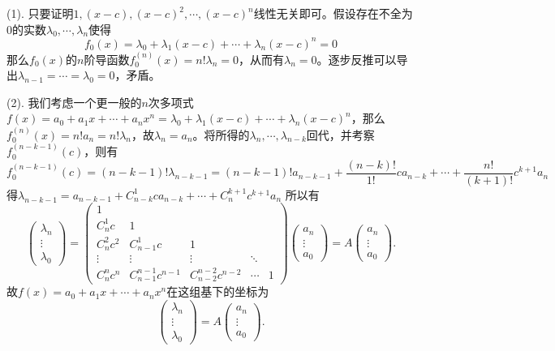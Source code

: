 (1). 只要证明$1, (x-c), (x-c)^2, \cdots, (x-c)^n$线性无关即可。假设存在不全为0的实数$\lambda_0,\cdots,\lambda_n$使得
$$f_0(x) = \lambda_0 + \lambda_1(x-c) + \cdots + \lambda_n(x-c)^n = 0$$
那么$f_0(x)$的$n$阶导函数$f_0^{(n)}(x) = n!\lambda_n = 0$，从而有$\lambda_n = 0$。逐步反推可以导出$\lambda_{n-1} = \cdots = \lambda_0 = 0$，矛盾。

(2). 我们考虑一个更一般的$n$次多项式$f(x) = a_0 + a_1x + \cdots + a_nx^n = \lambda_0 + \lambda_1(x-c) + \cdots + \lambda_n(x-c)^n$，那么$f_0^{(n)}(x) = n! a_n = n! \lambda_n$，故$\lambda_n = a_n$。将所得的$\lambda_n,\cdots,\lambda_{n-k}$回代，并考察$f_0^{(n-k-1)}(c)$，则有
$$
f_0^{(n-k-1)}(c) = (n-k-1)!\lambda_{n-k-1} = (n-k-1)!a_{n-k-1} + \dfrac{(n-k)!}{1!} c a_{n-k} + \cdots + \dfrac{n!}{(k+1)!} c^{k+1} a_{n}
$$
得$\lambda_{n-k-1} = a_{n-k-1} + C_{n-k}^1c a_{n-k} + \cdots + C_{n}^{k+1}c^{k+1} a_{n}$
所以有
$$
\begin{pmatrix} \lambda_n \\ \vdots \\ \lambda_0 \end{pmatrix}
= \begin{pmatrix} 1 & & & & \\ C_{n}^1c & 1 & & & \\ C_{n}^2c^2 & C_{n-1}^1c & 1 & & \\ \vdots & \vdots & \vdots & \ddots & \\ C_{n}^nc^n & C_{n-1}^{n-1}c^{n-1} & C_{n-2}^{n-2}c^{n-2} & \cdots & 1 \end{pmatrix}
\begin{pmatrix} a_n \\ \vdots \\ a_0 \end{pmatrix} = A\begin{pmatrix} a_n \\ \vdots \\ a_0 \end{pmatrix}.
$$
故$f(x) = a_0 + a_1x + \cdots + a_nx^n$在这组基下的坐标为
$$\begin{pmatrix} \lambda_n \\ \vdots \\ \lambda_0 \end{pmatrix} = A \begin{pmatrix} a_n \\ \vdots \\ a_0 \end{pmatrix}.$$

